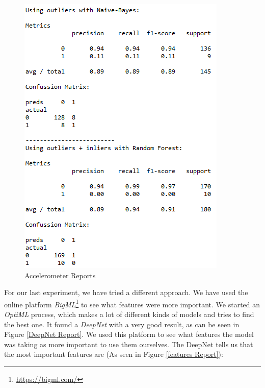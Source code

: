 \documentclass[idxtotoc,hyperref,openany]{labbook} %
\begin{document}
\begin{figure}[h]
\includegraphics[width=0.9\linewidth]{Milestone3/report_gyroscope.png}
\setlength\belowcaptionskip{-10pt}
\caption{Accelerometer Reports}
\label{Gyroscope Report}
\end{figure}



For our last experiment, we have tried a different approach. We have used the online platform \textit{BigML}\footnote{\href{https://bigml.com/}{https://bigml.com/}} to see what features were more important. We started an \textit{OptiML} process, which makes a lot of different kinds of models and tries to find the best one. It found a \textit{DeepNet} with a very good result, as can be seen in Figure \ref{DeepNet Report}. We used this platform to see what features the model was taking as more important to use them ourselves. The DeepNet tells us that the most important features are (As seen in Figure \ref{features Report}):
\end{document}
